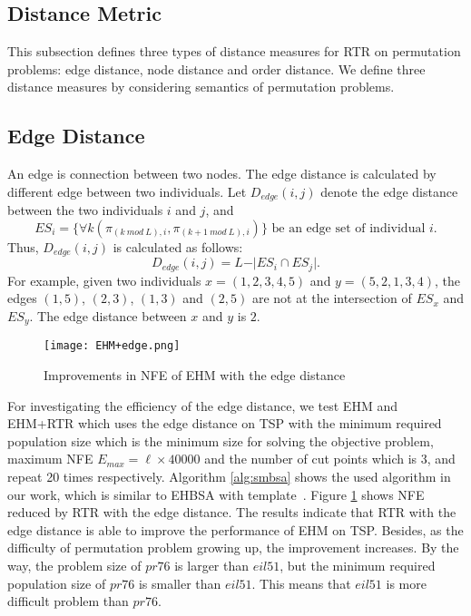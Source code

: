 \subsection{Distance Metric}

This subsection defines three types of distance measures for RTR on permutation problems: edge distance, node distance and order distance. We define three distance measures by considering semantics of permutation problems.
\subsection*{Edge Distance}


An edge is connection between two nodes. The edge distance is calculated by different edge between two individuals. Let $D_{edge} (i,j)$ denote the edge distance between the two individuals $i$ and $j$, and \[ES_i=\lbrace\forall k(\pi_{(k\ mod\ L),i}, \pi_{(k+1\ mod\ L),i})\rbrace\mbox{ be an edge set of individual }i.\] Thus, $D_{edge} (i,j)$ is calculated as follows:\[D_{edge} (i,j)=L-\vert ES_i\cap ES_j\vert.\] For example, given two individuals $x=(1,2,3,4,5)$ and $y=(5,2,1,3,4)$, the edges $(1,5)$, $(2,3)$, $(1,3)$ and $(2,5)$ are not at the intersection of $ES_x$ and $ES_y$. The edge distance between $x$ and $y$ is $2$. 


\begin{figure}[htbp] 
        \centering
        \texttt{[image: EHM+edge.png]}
        \caption{ Improvements in NFE of EHM with the edge distance } 
        \label{fig:ehbsa_imp}
\end{figure}

For investigating the efficiency of the edge distance, we test EHM and EHM+RTR which uses the edge distance on TSP with the minimum required population size which is the minimum size for solving the objective problem, maximum NFE $E_{max} = \ell\times 40000$ and the number of cut points which is 3, and repeat 20 times respectively. Algorithm \ref{alg:smbsa} shows the used algorithm in our work, which is similar to EHBSA with template~\cite{tsutsui2002probabilistic}. Figure \ref{fig:ehbsa_imp} shows NFE reduced by RTR with the edge distance. 
The results indicate that RTR with the edge distance is able to improve the performance of EHM on TSP. Besides, as the difficulty of permutation problem growing up, the improvement increases. By the way, the problem size of $pr76$ is larger than $eil51$, but the minimum required population size of $pr76$ is smaller than $eil51$. This means that $eil51$ is more difficult problem than $pr76$. 

